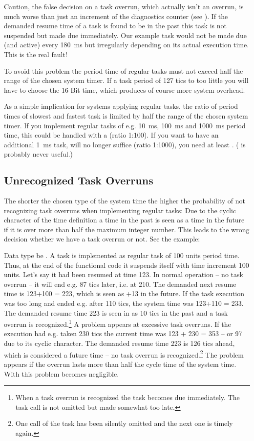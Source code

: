 Caution, the false decision on a task overrun, which actually isn't an
overrun, is much worse than just an increment of the diagnostics counter
(see ). If the demanded resume time of
a task is found to be in the past this task is not suspended but made due
immediately. Our example task would not be made due (and active) every
180~ms but irregularly depending on its actual execution time. This is the
real fault!

To avoid this problem the period time of regular tasks must not exceed
half the range of the chosen system timer. If a task period of 127 tics to
too little you will have to choose the 16 Bit time, which produces of
course more system overhead.

As a simple implication for systems applying regular tasks, the ratio of
period times of slowest and fastest task is limited by half the range of
the chosen system timer. If you implement regular tasks of e.g. 10~ms,
100~ms and 1000~ms period time, this could be handled with a
 (ratio 1:100). If you want to have an additional 1~ms
task,  will no longer suffice (ratio 1:1000), you need at
least . ( is probably never useful.)


\subsection{Unrecognized Task Overruns}

The shorter the chosen type of the system time the higher the probability
of not recognizing task overruns when implementing regular tasks: Due to
the cyclic character of the time definition a time in the past is seen as
a time in the future if it is over more than half the maximum integer
number. This leads to the wrong decision whether we have a task overrun or
not. See the example:

Data type be . A task is implemented as regular task of
100 units period time. Thus, at the end of the functional code it suspends
itself with time increment 100 units. Let's say it had been resumed at
time 123. In normal operation -- no task overrun -- it will end e.g. 87
tics later, i.e. at 210. The demanded next resume time is 123+100 = 223,
which is seen as +13 in the future. If the task execution was too long and
ended e.g. after 110 tics, the system time was 123+110 = 233. The demanded
resume time 223 is seen in as 10 tics in the past and a task overrun is
recognized.\footnote{When a task overrun is recognized the task becomes
due immediately. The task call is not omitted but made somewhat too late.}
A problem appears at excessive task overruns. If the execution had e.g.
taken 230 tics the current time was 123 + 230 = 353 -- or 97 due to its
cyclic character. The demanded resume time 223 is 126 tics ahead, which is
considered a future time -- no task overrun is recognized.\footnote{One
call of the task has been silently omitted and the next one is timely
again.} The problem appears if the overrun lasts more than half the cycle
time of the system time. With  this problem becomes
negligible.


